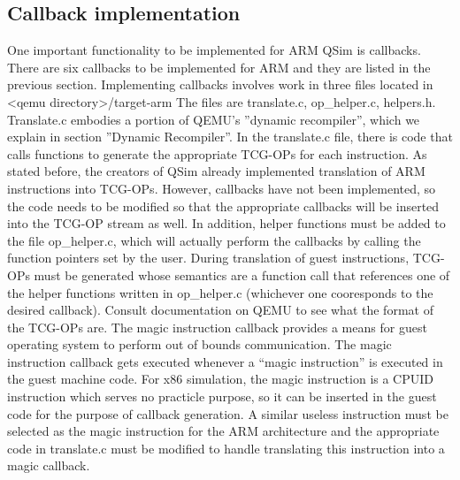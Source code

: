 \documentclass[letterpaper,11pt,twocolumn]{article}
\begin{document}
\subsection{Callback implementation}
One important functionality to be implemented for ARM QSim is callbacks. There are six callbacks to be implemented for ARM and they are listed in the previous section. Implementing callbacks involves work in three files located in
<qemu directory>/target-arm The files are translate.c, op\_helper.c, helpers.h. Translate.c embodies a portion of QEMU’s ''dynamic recompiler'', which we explain in section ''Dynamic Recompiler''. In the translate.c file, there is code that calls functions to generate the appropriate TCG-OPs for each instruction. As stated before, the creators of QSim already implemented translation of ARM instructions into TCG-OPs. However, callbacks have not been implemented, so the code needs to be modified so that the appropriate callbacks will be inserted into the TCG-OP stream as well. In addition, helper functions must be added to the file op\_helper.c, which will actually perform the callbacks by calling the  function pointers set by the user. During translation of guest instructions, TCG-OPs must be generated whose semantics are a function call that references one of the helper functions written in op\_helper.c (whichever one cooresponds to the desired callback). Consult documentation on QEMU to see what the format of the TCG-OPs are.
The magic instruction callback provides a means for guest operating system to perform out of bounds communication. The magic instruction callback gets executed whenever a “magic instruction” is executed in the guest machine code. For x86 simulation, the magic instruction is a CPUID instruction which serves no practicle purpose, so it can be inserted in the guest code for the purpose of callback generation. A similar useless instruction must be selected as the magic instruction for the ARM architecture and the appropriate code in translate.c must be modified to handle translating this instruction into a magic callback.
\end{document}
